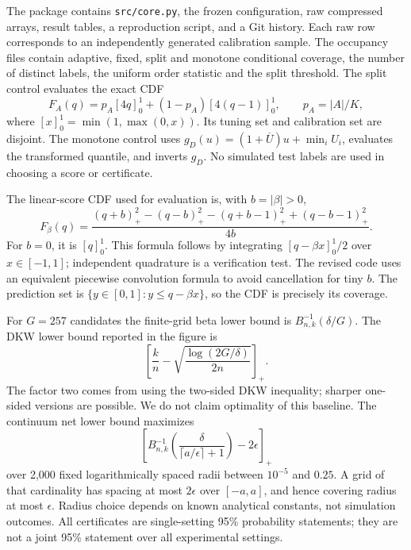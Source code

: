 \documentclass{article}
\begin{document}
The package contains \texttt{src/core.py}, the frozen configuration, raw compressed arrays, result tables, a reproduction script, and a Git history. Each raw row corresponds to an independently generated calibration sample. The occupancy files contain adaptive, fixed, split and monotone conditional coverage, the number of distinct labels, the uniform order statistic and the split threshold. The split control evaluates the exact CDF
\begin{equation}
 F_A(q)=p_A[4q]_0^1+(1-p_A)[4(q-1)]_0^1,\qquad p_A=|A|/K,
\end{equation}
where $[x]_0^1=\min(1,\max(0,x))$. Its tuning set and calibration set are disjoint. The monotone control uses $g_D(u)=(1+\overline U)u+\min_iU_i$, evaluates the transformed quantile, and inverts $g_D$. No simulated test labels are used in choosing a score or certificate.

The linear-score CDF used for evaluation is, with $b=|\beta|>0$,
\begin{equation}
 F_\beta(q)=\frac{(q+b)_+^2-(q-b)_+^2-(q+b-1)_+^2+(q-b-1)_+^2}{4b}.
\end{equation}
For $b=0$, it is $[q]_0^1$. This formula follows by integrating $[q-\beta x]_0^1/2$ over $x\in[-1,1]$; independent quadrature is a verification test. The revised code uses an equivalent piecewise convolution formula to avoid cancellation for tiny $b$. The prediction set is $\{y\in[0,1]:y\le q-\beta x\}$, so the CDF is precisely its coverage.

For $G=257$ candidates the finite-grid beta lower bound is $B_{n,k}^{-1}(\delta/G)$. The DKW lower bound reported in the figure is
\begin{equation}
 \left[\frac{k}{n}-\sqrt{\frac{\log(2G/\delta)}{2n}}\right]_+.
\end{equation}
The factor two comes from using the two-sided DKW inequality; sharper one-sided versions are possible. We do not claim optimality of this baseline. The continuum net lower bound maximizes
\begin{equation}
 \left[B_{n,k}^{-1}\left(\frac{\delta}{\lceil a/\epsilon\rceil+1}\right)-2\epsilon\right]_+
\end{equation}
over 2,000 fixed logarithmically spaced radii between $10^{-5}$ and $0.25$. A grid of that cardinality has spacing at most $2\epsilon$ over $[-a,a]$, and hence covering radius at most $\epsilon$. Radius choice depends on known analytical constants, not simulation outcomes. All certificates are single-setting 95\% probability statements; they are not a joint 95\% statement over all experimental settings.
\end{document}
